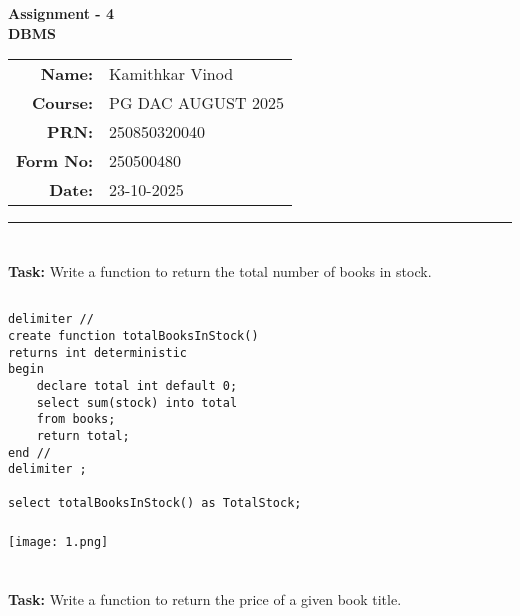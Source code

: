 \documentclass[12pt,a4paper]{article}
\begin{document}
\begin{center}
    \LARGE \textbf{Assignment - 4} \\[0.5cm]
    \Large \textbf{DBMS} \\[1cm]

    \begin{tabular}{rl}
        \textbf{Name:} & Kamithkar Vinod \\
        \textbf{Course:} & PG DAC AUGUST 2025 \\
        \textbf{PRN:} & 250850320040 \\
        \textbf{Form No:} & 250500480 \\
        \textbf{Date:} & 23-10-2025 \\
    \end{tabular}
\end{center}

\vspace{1cm}
\hrule
\vspace{0.5cm}


\section{}
\textbf{Task:} Write a function to return the total number of books in stock.

\subsection{}
\begin{lstlisting}
delimiter //
create function totalBooksInStock()
returns int deterministic
begin
	declare total int default 0;
    select sum(stock) into total
    from books;
    return total;
end //
delimiter ;

select totalBooksInStock() as TotalStock;
\end{lstlisting}

\subsubsection{}
\begin{center}
    \texttt{[image: 1.png]}
\end{center}


\section{}
\textbf{Task:} Write a function to return the price of a given book title.
\end{document}
